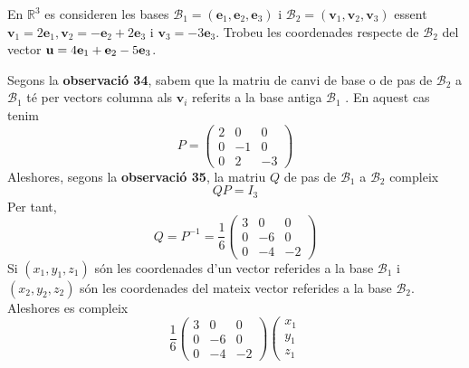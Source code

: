 \begin{exemple}
En $\mathbb{R}^{3}$ es consideren les bases $\mathcal{B}_{1}=(\mathbf{e}_{1},%
\mathbf{e}_{2},\mathbf{e}_{3})$ i $\mathcal{B}_{2}=(\mathbf{v}_{1},\mathbf{v}%
_{2},\mathbf{v}_{3})$ essent $\mathbf{v}_{1}=2\mathbf{e}_{1},\mathbf{v}_{2}=-%
\mathbf{e}_{2}+2\mathbf{e}_{3}$ i $\mathbf{v}_{3}=-3\mathbf{e}_{3}$. Trobeu
les coordenades respecte de $\mathcal{B}_{2}$ del vector $\mathbf{u}=4\mathbf{%
e}_{1}+\mathbf{e}_{2}-5\mathbf{e}_{3}$.

\end{exemple}
\begin{solucio}
Segons la \textbf{observació 34}, sabem que la matriu de canvi de
base o de pas de $\mathcal{B}_{2}$ a $\mathcal{B}_{1}$ té per vectors
columna als $\mathbf{v}_{i}$ referits a la base antiga $\mathcal{B}_{1}$%
. En aquest cas tenim%
\begin{equation*}
P=\left( 
\begin{array}{ccc}
2 & 0 & 0 \\ 
0 & -1 & 0 \\ 
0 & 2 & -3%
\end{array}%
\right)
\end{equation*}%
Aleshores, segons la \textbf{observació 35}, la matriu $Q$ de pas de 
$\mathcal{B}_{1}$ a $\mathcal{B}_{2}$ compleix%
\begin{equation*}
QP=I_{3}
\end{equation*}%
Per tant,%
\begin{equation*}
Q=P^{-1}=\frac{1}{6}\left( 
\begin{array}{ccc}
3 & 0 & 0 \\ 
0 & -6 & 0 \\ 
0 & -4 & -2%
\end{array}%
\right)
\end{equation*}%
Si $(x_{1},y_{1},z_{1})$ són les coordenades d’un vector referides a la
base $\mathcal{B}_{1}$ i $(x_{2},y_{2},z_{2})$ són les coordenades del mateix
vector referides a la base $\mathcal{B}_{2}$. Aleshores es compleix%
\begin{equation*}
\frac{1}{6}\left( 
\begin{array}{ccc}
3 & 0 & 0 \\ 
0 & -6 & 0 \\ 
0 & -4 & -2%
\end{array}%
\right) \left( 
\begin{array}{c}
x_{1} \\ 
y_{1} \\ 
z_{1}%
\end{array}%

\end{equation*}
\end{solucio}
